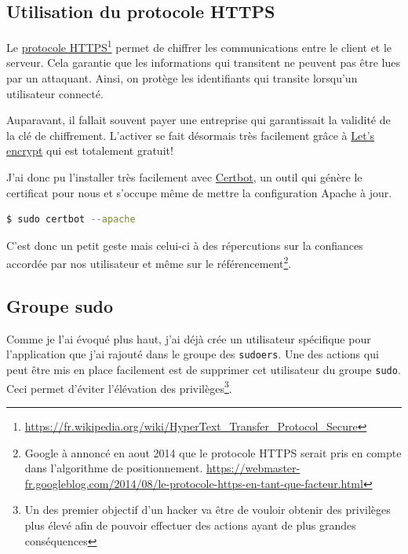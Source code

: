 \documentclass[]{report}
\newcommand\fnurl[2]{%
  \href{#1}{#2}\footnote{\url{#1}}%
}
\begin{document}
    \subsection{Utilisation du protocole HTTPS}

      Le \fnurl{https://fr.wikipedia.org/wiki/HyperText_Transfer_Protocol_Secure}{protocole HTTPS} permet de chiffrer les communications entre le client et le serveur. Cela garantie que les informations qui transitent ne peuvent pas être lues par un attaquant. Ainsi, on protège les identifiants qui transite lorsqu'un utilisateur connecté.

      Auparavant, il fallait souvent payer une entreprise qui garantissait la validité de la clé de chiffrement. L'activer se fait  désormais très facilement grâce à \href{https://letsencrypt.org/}{Let's encrypt} qui est totalement gratuit!

      J'ai donc pu l'installer très facilement avec \href{https://certbot.eff.org/}{Certbot}, un outil qui génère le certificat pour nous et s’occupe même de mettre la configuration Apache à jour.

      \begin{scriptsize}
        \begin{lstlisting}[language=bash]
        $ sudo certbot --apache
        \end{lstlisting}
      \end{scriptsize}

      C'est donc un petit geste mais celui-ci à des répercutions sur la confiances accordée par nos utilisateur et même sur le référencement\footnote{Google à annoncé en aout 2014 que le protocole HTTPS serait pris en compte dans l'algorithme de positionnement. \url{https://webmaster-fr.googleblog.com/2014/08/le-protocole-https-en-tant-que-facteur.html}}.

    \subsection{Groupe sudo}

      Comme je l'ai évoqué plus haut, j'ai déjà crée un utilisateur spécifique pour l'application que j'ai rajouté dans le groupe des \verb|sudoers|. Une des actions qui peut être mis en place facilement est de supprimer cet utilisateur du groupe \verb|sudo|. Ceci permet d'éviter l’élévation des privilèges\footnote{Un des premier objectif d'un hacker va être de vouloir obtenir des privilèges plus élevé afin de pouvoir effectuer des actions ayant de plus grandes conséquences}.
\end{document}
